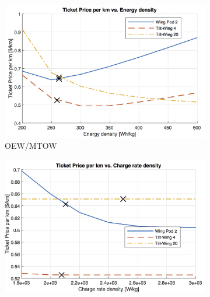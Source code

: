 \begin{figure}[H]
\begin{subfigure}[t]{0.33\textwidth}
    \captionsetup{width=.8\linewidth}
    \caption{}
    \label{fig:sens6}
\end{subfigure}
\label{fig:sens456}
\end{figure}

\begin{figure}[H]
\begin{subfigure}[t]{0.33\textwidth}
    \centering
    \includegraphics[width=\textwidth]{Figures/Edens_TPrice_perkmNOPAD.png}
    \captionsetup{width=.8\linewidth}
    \caption{OEW/MTOW}
    \label{fig:sens7}
\end{subfigure}
\begin{subfigure}[t]{0.33\textwidth}
    \centering
    \includegraphics[width=\textwidth]{Figures/CRate_TPrice_perkmNOPAD.png}
    \captionsetup{width=.8\linewidth}
    \caption{}
    \label{fig:sens8}
\end{subfigure}
\begin{subfigure}[t]{0.33\textwidth}

\end{subfigure}
\end{figure}
